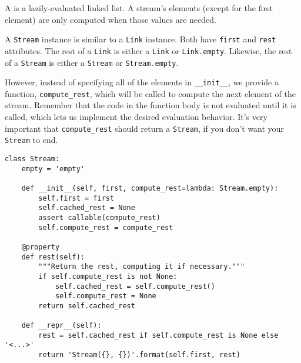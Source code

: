 A  is a lazily-evaluated linked list. A stream's elements
(except for the first element) are only computed when those values are needed.

A \lstinline$Stream$ instance is similar to a \lstinline$Link$ instance.
Both have \lstinline$first$ and \lstinline$rest$ attributes.
The rest of a \lstinline$Link$ is either a \lstinline$Link$ or
\lstinline$Link.empty$.
Likewise, the rest of a \lstinline$Stream$ is either a \lstinline$Stream$ or
\lstinline$Stream.empty$.

However, instead of specifying all of the elements in \lstinline$__init__$, we
provide a function, \lstinline$compute_rest$, which will be called to compute
the next element of the stream.
Remember that the code in the function body is not evaluated until it is
called, which lets us implement the desired evaluation behavior.
It's very important that \lstinline$compute_rest$ should return a
\lstinline$Stream$, if you don't want your \lstinline$Stream$ to end.

\begin{lstlisting}
class Stream:
    empty = 'empty'

    def __init__(self, first, compute_rest=lambda: Stream.empty):
        self.first = first
        self.cached_rest = None
        assert callable(compute_rest)
        self.compute_rest = compute_rest

    @property
    def rest(self):
        """Return the rest, computing it if necessary."""
        if self.compute_rest is not None:
            self.cached_rest = self.compute_rest()
            self.compute_rest = None
        return self.cached_rest

    def __repr__(self):
        rest = self.cached_rest if self.compute_rest is None else '<...>'
        return 'Stream({}, {})'.format(self.first, rest)
\end{lstlisting}
